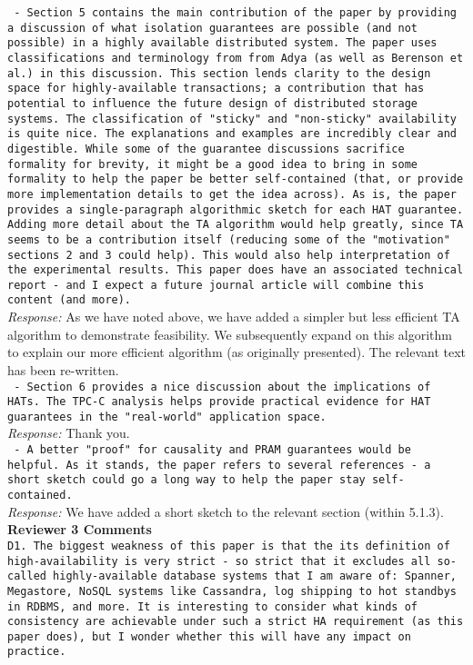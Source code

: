\documentclass[10pt]{article}
\newcommand{\reviewer}[1] {\noindent\texttt{#1}\\}
\newcommand{\response}[1] {\noindent\textit{Response: } #1\\}
\begin{document}
\reviewer{ - Section 5 contains the main contribution of the paper by providing a discussion of what isolation guarantees are possible (and not possible) in a highly available distributed system. The paper uses classifications and terminology from from Adya (as well as Berenson et al.) in this discussion. This section lends clarity to the design space for highly-available transactions; a contribution that has potential to influence the future design of distributed storage systems. The classification of "sticky" and "non-sticky" availability is quite nice. The explanations and examples are incredibly clear and digestible. While some of the guarantee discussions sacrifice formality for brevity, it might be a good idea to bring in some formality to help the paper be better self-contained (that, or provide more implementation details to get the idea across). As is, the paper provides a single-paragraph algorithmic sketch for each HAT guarantee. Adding more detail about the TA algorithm would help greatly, since TA seems to be a contribution itself (reducing some of the "motivation" sections 2 and 3 could help). This would also help interpretation of the experimental results. This paper does have an associated technical report - and I expect a future journal article will combine this content (and more). }

\response{As we have noted above, we have added a simpler but less efficient TA
algorithm to demonstrate feasibility. We subsequently expand on this
algorithm to explain our more efficient algorithm (as originally
presented). The relevant text has been re-written.}

\reviewer{ - Section 6 provides a nice discussion about the implications of HATs. The TPC-C analysis helps provide practical evidence for HAT guarantees in the "real-world" application space. }

\response{Thank you.}

\reviewer{ - A better "proof" for causality and PRAM guarantees would be helpful. As it stands, the paper refers to several references - a short sketch could go a long way to help the paper stay self-contained.}

\response{We have added a short sketch to the relevant section (within 5.1.3).}

\newpage
\noindent\textbf{Reviewer 3 Comments}\\

\reviewer{D1. The biggest weakness of this paper is that the its definition of high-availability is very strict - so strict that it excludes all so-called highly-available database systems that I am aware of: Spanner, Megastore, NoSQL systems like Cassandra, log shipping to hot standbys in RDBMS, and more. It is interesting to consider what kinds of consistency are achievable under such a strict HA requirement (as this paper does), but I wonder whether this will have any impact on practice.}
\end{document}
